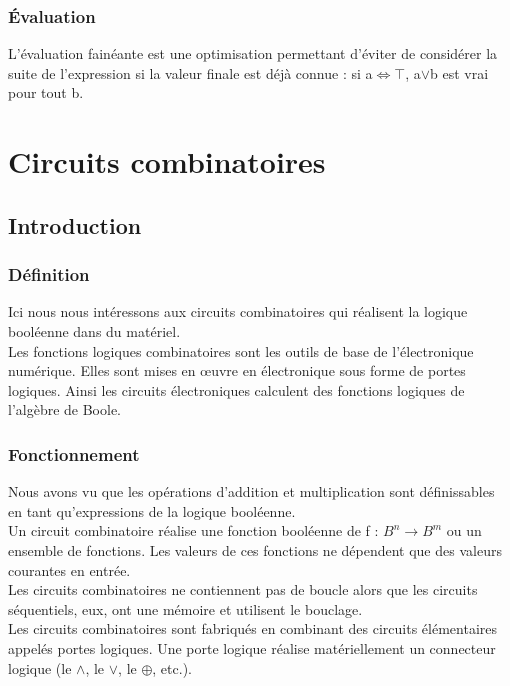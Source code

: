 \documentclass[a4paper,10pt]{book}
\begin{document}
\subsection{Évaluation}
L’évaluation fainéante est une optimisation permettant d’éviter de considérer la suite de l’expression si la valeur finale est déjà connue : si a$\Leftrightarrow\top$, a$\vee$b est vrai pour tout b.\\

\chapter{Circuits combinatoires}
\section{Introduction}
\subsection{Définition}
Ici nous nous intéressons aux circuits combinatoires qui réalisent la logique booléenne dans du matériel.\\

Les fonctions logiques combinatoires sont les outils de base de l'électronique numérique. Elles sont mises en œuvre en électronique sous forme de portes logiques. Ainsi les circuits électroniques calculent des fonctions logiques de l'algèbre de Boole.

\subsection{Fonctionnement}
Nous avons vu que les opérations d’addition et multiplication sont définissables en tant qu’expressions de la logique booléenne.\\

Un circuit combinatoire réalise une fonction booléenne de f : $B^{n}\rightarrow B^{m}$ ou un ensemble de fonctions.
Les valeurs de ces fonctions ne dépendent que des valeurs courantes en entrée.\\

Les circuits combinatoires ne contiennent pas de boucle alors que les circuits séquentiels, eux, ont une mémoire et utilisent le bouclage.\\

Les circuits combinatoires sont fabriqués en combinant des circuits élémentaires appelés portes logiques. Une porte logique réalise matériellement un connecteur logique (le $\wedge$, le $\vee$, le $\oplus$, etc.).\\
\end{document}
